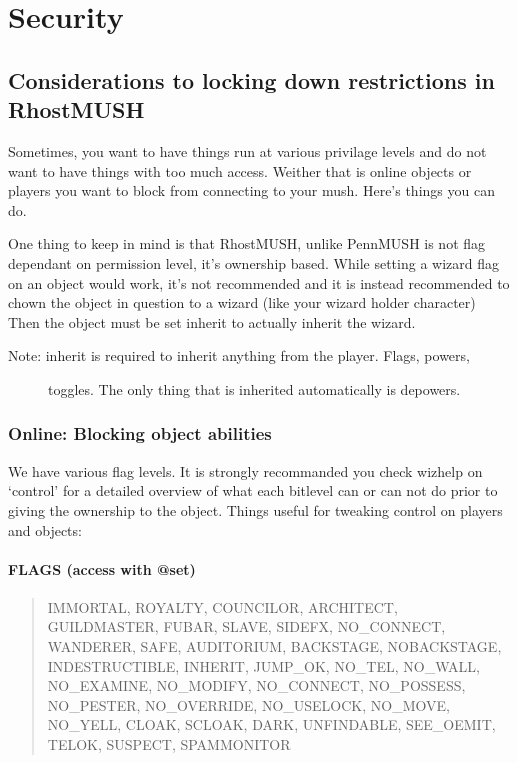 \documentclass[letterpaper,10pt,english]{sphinxmanual}
\begin{document}
\chapter{Security}
\label{\detokenize{security:security}}\label{\detokenize{security::doc}}

\section{Considerations to locking down restrictions in RhostMUSH}
\label{\detokenize{security:considerations-to-locking-down-restrictions-in-rhostmush}}
\sphinxAtStartPar
Sometimes, you want to have things run at various privilage levels and do not
want to have things with too much access.  Weither that is online objects or
players you want to block from connecting to your mush.  Here’s things you can
do.

\sphinxAtStartPar
One thing to keep in mind is that RhostMUSH, unlike PennMUSH is not flag
dependant on permission level, it’s ownership based.  While setting a wizard
flag on an object would work, it’s not recommended and it is instead recommended
to chown the object in question to a wizard (like your wizard holder character)
Then the object must be set inherit to actually inherit the wizard.
\begin{description}
\item[{Note: inherit is required to inherit anything from the player.  Flags, powers,}] \leavevmode
\sphinxAtStartPar
toggles.  The only thing that is inherited automatically is depowers.

\end{description}


\subsection{Online: Blocking object abilities}
\label{\detokenize{security:online-blocking-object-abilities}}
\sphinxAtStartPar
We have various flag levels.  It is strongly recommanded you check wizhelp
on ‘control’ for a detailed overview of what each bitlevel can or can not do
prior to giving the ownership to the object.  Things useful for tweaking control
on players and objects:


\subsubsection{FLAGS (access with @set)}
\label{\detokenize{security:flags-access-with-set}}\begin{quote}

\sphinxAtStartPar
IMMORTAL, ROYALTY, COUNCILOR, ARCHITECT, GUILDMASTER,
FUBAR, SLAVE, SIDEFX, NO\_CONNECT, WANDERER, SAFE,
AUDITORIUM, BACKSTAGE, NOBACKSTAGE, INDESTRUCTIBLE,
INHERIT, JUMP\_OK, NO\_TEL, NO\_WALL, NO\_EXAMINE,
NO\_MODIFY, NO\_CONNECT, NO\_POSSESS, NO\_PESTER,
NO\_OVERRIDE, NO\_USELOCK, NO\_MOVE, NO\_YELL, CLOAK,
SCLOAK, DARK, UNFINDABLE, SEE\_OEMIT, TELOK, SUSPECT,
SPAMMONITOR
\end{quote}
\end{document}

